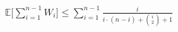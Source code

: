 \documentclass[preview]{standalone}
\begin{document}
\begin{align*}
\mathbb{E} \Bigg[ \sum_{i=1}^{n-1} W_i \Bigg] \leq \sum_{i=1}^{n-1} \frac{i}{i \cdot (n-i) + \binom{i}{2} + 1}
\end{align*}
\end{document}
